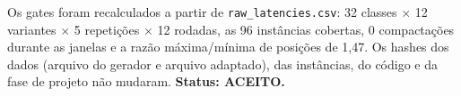 Os gates foram recalculados a partir de \texttt{raw\_latencies.csv}: 32 classes $\times$ 12 variantes $\times$ 5 repetições $\times$ 12 rodadas, as 96 instâncias cobertas, 0 compactações durante as janelas e a razão máxima/mínima de posições de 1,47. Os hashes dos dados (arquivo do gerador e arquivo adaptado), das instâncias, do código e da fase de projeto não mudaram. \textbf{Status: ACEITO.}

